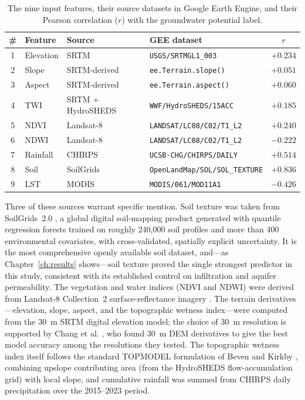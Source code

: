 \begin{table}[H]
\centering
\caption{The nine input features, their source datasets in Google Earth Engine,
         and their Pearson correlation ($r$) with the groundwater potential label.}
\label{tab:data_sources}
\small
\begin{tabular}{clll c}
\toprule
\# & Feature & Source & GEE dataset & $r$ \\
\midrule
1 & Elevation & SRTM            & \texttt{USGS/SRTMGL1\_003}                 & $+0.234$ \\
2 & Slope     & SRTM-derived    & \texttt{ee.Terrain.slope()}                & $+0.051$ \\
3 & Aspect    & SRTM-derived    & \texttt{ee.Terrain.aspect()}               & $+0.060$ \\
4 & TWI       & SRTM + HydroSHEDS & \texttt{WWF/HydroSHEDS/15ACC}            & $+0.185$ \\
5 & NDVI      & Landsat-8       & \texttt{LANDSAT/LC08/C02/T1\_L2}           & $+0.240$ \\
6 & NDWI      & Landsat-8       & \texttt{LANDSAT/LC08/C02/T1\_L2}           & $-0.222$ \\
7 & Rainfall  & CHIRPS          & \texttt{UCSB-CHG/CHIRPS/DAILY}             & $+0.514$ \\
8 & Soil      & SoilGrids       & \texttt{OpenLandMap/SOL/SOL\_TEXTURE}      & $+0.836$ \\
9 & LST       & MODIS           & \texttt{MODIS/061/MOD11A1}                 & $-0.426$ \\
\bottomrule
\end{tabular}
\end{table}

Three of these sources warrant specific mention. Soil texture was taken from
SoilGrids~2.0 \cite{poggio2021soilgrids}, a global digital soil-mapping product
generated with quantile regression forests trained on roughly 240,000 soil
profiles and more than 400 environmental covariates, with cross-validated,
spatially explicit uncertainty. It is the most comprehensive openly available
soil dataset, and---as Chapter~\ref{ch:results} shows---soil texture proved the
single strongest predictor in this study, consistent with its established control
on infiltration and aquifer permeability. The vegetation and water indices (NDVI
and NDWI) were derived from Landsat-8 Collection~2 surface-reflectance imagery
\cite{wulder2019landsat}. The terrain derivatives---elevation, slope, aspect, and
the topographic wetness index---were computed from the 30~m SRTM digital
elevation model; the choice of 30~m resolution is supported by Chang et al.
\cite{chang2019scaleeffects}, who found 30~m DEM derivatives to give the best
model accuracy among the resolutions they tested. The topographic wetness index
itself follows the standard TOPMODEL formulation of Beven and Kirkby
\cite{beven1979topmodel}, combining upslope contributing area (from the
HydroSHEDS flow-accumulation grid) with local slope, and cumulative rainfall was
summed from CHIRPS daily precipitation over the 2015--2023 period.

